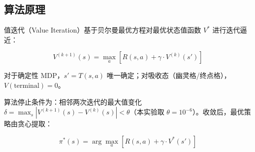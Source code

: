 \documentclass[12pt,a4paper]{ctexart}
\begin{document}
\subsection{算法原理}

值迭代（Value Iteration）基于贝尔曼最优方程对最优状态值函数 $V^*$ 进行迭代逼近：

\begin{equation}
    V^{(k+1)}(s) = \max_{a} \left[ R(s,a) + \gamma \cdot V^{(k)}(s') \right]
\end{equation}

对于确定性 MDP，$s' = T(s,a)$ 唯一确定；对吸收态（幽灵格/终点格），$V(\text{terminal}) = 0$。

算法停止条件为：相邻两次迭代的最大值变化 $\delta = \max_s |V^{(k+1)}(s) - V^{(k)}(s)| < \theta$（本实验取 $\theta = 10^{-6}$）。收敛后，最优策略由贪心提取：

\begin{equation}
    \pi^*(s) = \arg\max_{a} \left[ R(s,a) + \gamma \cdot V^*(s') \right]
\end{equation}







\end{document}
